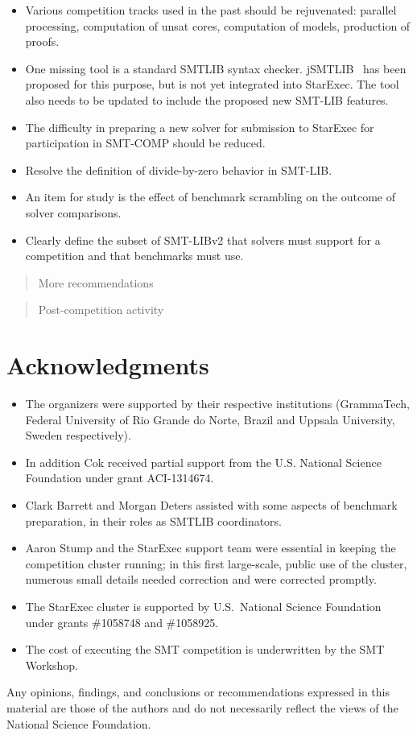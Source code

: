 \documentclass[twoside,11pt]{article}
\newcommand{\comment}[2]{\begin{quote}\sc #1\marginpar{\textcolor{red}{$\ast^{\mbox{#2}}$}}\end{quote}}
\newcommand{\davidc}[1]{\comment{#1}{DC}}
\begin{document}
\begin{itemize}
\item Various competition tracks used in the past should be rejuvenated: parallel processing, computation of unsat cores, computation of models, production of proofs.
\item One missing tool is a standard SMTLIB syntax checker. jSMTLIB~\cite{TBD} has been proposed for this purpose, but is not yet integrated into StarExec. The tool also needs to be updated to include the proposed new SMT-LIB features.
\item The difficulty in preparing a new solver for submission to StarExec for participation in SMT-COMP should be reduced.
\item Resolve the definition of divide-by-zero behavior in SMT-LIB.
\item An item for study is the effect of benchmark scrambling on the outcome of solver comparisons.
\item Clearly define the subset of SMT-LIBv2 that solvers must support for a competition and that benchmarks must use.
\end{itemize}
\davidc{More recommendations}

\davidc{Post-competition activity}



\section*{Acknowledgments} 
\begin{itemize}
\item The organizers were supported by their respective institutions (GrammaTech, Federal University of Rio Grande do Norte, Brazil and Uppsala University, Sweden respectively). 

\item In addition Cok received partial support from the U.S. National Science Foundation
under grant ACI-1314674.

\item Clark Barrett and Morgan Deters assisted with some aspects of benchmark preparation,
in their roles as SMTLIB coordinators.

\item Aaron Stump and the StarExec support team were essential in keeping the competition cluster running;
in this first large-scale, public use of the cluster, numerous small details needed correction and were corrected promptly.

\item The StarExec cluster is supported by 
U.S.\ National Science Foundation under grants \#1058748 and \#1058925.


\item The cost of executing the SMT competition is underwritten by the SMT Workshop. 
\end{itemize}

Any opinions,
findings, and conclusions or recommendations expressed in this
material are those of the authors and do not necessarily reflect the
views of the National Science Foundation.



\end{document}

